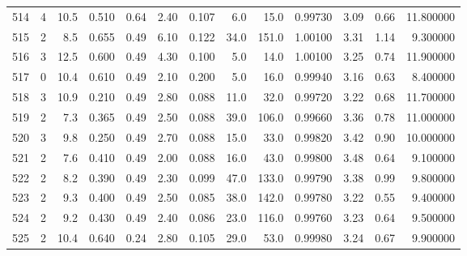 \begin{tabular}{lrrrrrrrrrrrr}
514  &        4 &           10.5 &             0.510 &         0.64 &            2.40 &      0.107 &                  6.0 &                  15.0 &  0.99730 &  3.09 &       0.66 &  11.800000 \\
515  &        2 &            8.5 &             0.655 &         0.49 &            6.10 &      0.122 &                 34.0 &                 151.0 &  1.00100 &  3.31 &       1.14 &   9.300000 \\
516  &        3 &           12.5 &             0.600 &         0.49 &            4.30 &      0.100 &                  5.0 &                  14.0 &  1.00100 &  3.25 &       0.74 &  11.900000 \\
517  &        0 &           10.4 &             0.610 &         0.49 &            2.10 &      0.200 &                  5.0 &                  16.0 &  0.99940 &  3.16 &       0.63 &   8.400000 \\
518  &        3 &           10.9 &             0.210 &         0.49 &            2.80 &      0.088 &                 11.0 &                  32.0 &  0.99720 &  3.22 &       0.68 &  11.700000 \\
519  &        2 &            7.3 &             0.365 &         0.49 &            2.50 &      0.088 &                 39.0 &                 106.0 &  0.99660 &  3.36 &       0.78 &  11.000000 \\
520  &        3 &            9.8 &             0.250 &         0.49 &            2.70 &      0.088 &                 15.0 &                  33.0 &  0.99820 &  3.42 &       0.90 &  10.000000 \\
521  &        2 &            7.6 &             0.410 &         0.49 &            2.00 &      0.088 &                 16.0 &                  43.0 &  0.99800 &  3.48 &       0.64 &   9.100000 \\
522  &        2 &            8.2 &             0.390 &         0.49 &            2.30 &      0.099 &                 47.0 &                 133.0 &  0.99790 &  3.38 &       0.99 &   9.800000 \\
523  &        2 &            9.3 &             0.400 &         0.49 &            2.50 &      0.085 &                 38.0 &                 142.0 &  0.99780 &  3.22 &       0.55 &   9.400000 \\
524  &        2 &            9.2 &             0.430 &         0.49 &            2.40 &      0.086 &                 23.0 &                 116.0 &  0.99760 &  3.23 &       0.64 &   9.500000 \\
525  &        2 &           10.4 &             0.640 &         0.24 &            2.80 &      0.105 &                 29.0 &                  53.0 &  0.99980 &  3.24 &       0.67 &   9.900000 \\

\end{tabular}
